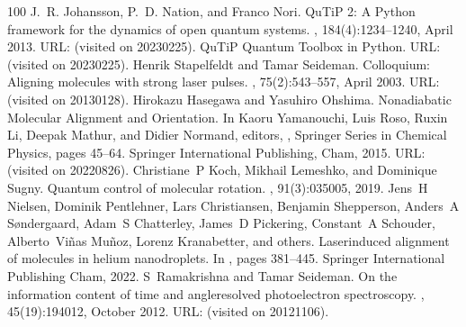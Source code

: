 \documentclass[letterpaper,table,10pt,english]{jupyterBook}
\begin{document}
\begin{sphinxthebibliography}{100}
\sphinxAtStartPar
J. R. Johansson, P. D. Nation, and Franco Nori. QuTiP 2: A Python framework for the dynamics of open quantum systems. , 184(4):1234–1240, April 2013. URL:  (visited on 2023\sphinxhyphen{}02\sphinxhyphen{}25).
\sphinxAtStartPar
QuTiP \sphinxhyphen{} Quantum Toolbox in Python. URL:  (visited on 2023\sphinxhyphen{}02\sphinxhyphen{}25).
\sphinxAtStartPar
Henrik Stapelfeldt and Tamar Seideman. Colloquium: Aligning molecules with strong laser pulses. , 75(2):543–557, April 2003. URL:  (visited on 2013\sphinxhyphen{}01\sphinxhyphen{}28).
\sphinxAtStartPar
Hirokazu Hasegawa and Yasuhiro Ohshima. Nonadiabatic Molecular Alignment and Orientation. In Kaoru Yamanouchi, Luis Roso, Ruxin Li, Deepak Mathur, and Didier Normand, editors, , Springer Series in Chemical Physics, pages 45–64. Springer International Publishing, Cham, 2015. URL:  (visited on 2022\sphinxhyphen{}08\sphinxhyphen{}26).
\sphinxAtStartPar
Christiane P Koch, Mikhail Lemeshko, and Dominique Sugny. Quantum control of molecular rotation. , 91(3):035005, 2019.
\sphinxAtStartPar
Jens H Nielsen, Dominik Pentlehner, Lars Christiansen, Benjamin Shepperson, Anders A Søndergaard, Adam S Chatterley, James D Pickering, Constant A Schouder, Alberto Viñas Muñoz, Lorenz Kranabetter, and others. Laser\sphinxhyphen{}induced alignment of molecules in helium nanodroplets. In , pages 381–445. Springer International Publishing Cham, 2022.
\sphinxAtStartPar
S Ramakrishna and Tamar Seideman. On the information content of time\sphinxhyphen{} and angle\sphinxhyphen{}resolved photoelectron spectroscopy. , 45(19):194012, October 2012. URL:  (visited on 2012\sphinxhyphen{}11\sphinxhyphen{}06).

\end{sphinxthebibliography}
\end{document}
